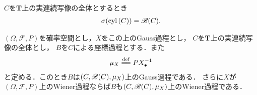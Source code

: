 	\begin{screen}
		\begin{thm}[連続写像の全体の筒集合族はBorel集合族を生成する]
			$C$を$\mathbf{T}$上の実連続写像の全体とするとき
			\begin{align}
				\sigma(\operatorname{cyl}\left(C\right)) = \mathscr{B}(C).
			\end{align}
		\end{thm}
	\end{screen}
	
	\begin{sketch}
	\end{sketch}
	
	\begin{screen}
		\begin{thm}\label{thm:Wiener_process_on_continuous_functions}
			$(\Omega,\mathscr{F},P)$を確率空間とし，$X$をこの上のGauss過程とし，
			$C$を$\mathbf{T}$上の実連続写像の全体とし，
			$B$を$C$による座標過程とする．また
			\begin{align}
				\mu_X \defeq P X_\bullet^{-1}
			\end{align}
			と定める．このとき$B$は$(C,\mathscr{B}(C),\mu_X)$上のGauss過程である．
			さらに$X$が$(\Omega,\mathscr{F},P)$上のWiener過程ならば$B$も$(C,\mathscr{B}(C),\mu_X)$上のWiener過程である．
		\end{thm}
	\end{screen}
	
